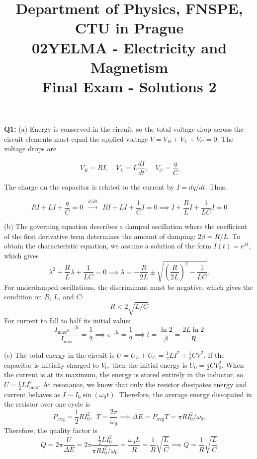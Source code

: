\documentclass[a4paper,12pt]{article}
\title{{\large Department of Physics, FNSPE, CTU in Prague} \\
                  02YELMA - Electricity and Magnetism \\ 
          {\Large \textbf{Final Exam - Solutions 2}}\vspace{-1cm}}
\date{}
\author{}
\begin{document}
\maketitle
\vspace{-0.9cm}

\noindent

\textbf{Q1:} (a) Energy is conserved in the circuit, so the total voltage drop across the circuit elements must equal the applied voltage $V=V_R+V_L+V_C=0$. The voltage drops are

\[
V_R = R I, \quad V_L = L\frac{dI}{dt}, \quad V_C = \frac{q}{C}
\]

The charge on the capacitor is related to the current by $I=dq/dt$. Thus,

\[
R I
+
L\dot{I}
+
\frac{q}{C} = 0 ~~\xrightarrow{d/dt}~~ 
R\dot{I}
+
L\ddot{I}
+
\frac{1}{C}I=0 \implies \boxed{
\ddot{I}
+
\frac{{R}}{L}\dot{I}
+
\frac{1}{LC}I
=
0
}
\]

(b) The governing equation describes a damped oscillation where the coefficient of the first derivative term determines the amount of damping: $2\beta = R/L$. To obtain the characteristic equation, we assume a solution of the form $I(t)=e^{\lambda t}$, which gives
\[
\lambda^2 + \frac{R}{L}\lambda + \frac{1}{LC} = 0 \implies \lambda = -\frac{R}{2L} \pm \sqrt{\left(\frac{R}{2L}\right)^2 - \frac{1}{LC}}.
\]
For underdamped oscillations, the discriminant must be negative, which gives the condition on $R$, $L$, and $C$:
\[
\boxed{
R<2\sqrt{L/C}
}
\]
For current to fall to half its initial value:
\[
\frac{I_\text{max}e^{-\beta t}}{I_\text{max}} = \frac{1}{2} \implies e^{-\beta t} = \frac{1}{2} \implies \boxed{t = \frac{\ln 2}{\beta} = \frac{2L\ln 2}{R}}
\]

(c) The total energy in the circuit is $U = U_L + U_C = \frac{1}{2}LI^2 + \frac{1}{2}CV^2$. If the capacitor is initially charged to $V_0$, then the initial energy is $U_0 = \frac{1}{2}CV_0^2$. When the current is at its maximum, the energy is stored entirely in the inductor, so $U = \frac{1}{2}LI_\text{max}^2$. At resonance, we know that only the resistor dissipates energy and current behaves as $I \sim I_0\sin(\omega_0 t)$. Therefore, the average energy dissopated in the resistor over one cycle is
\[
P_\text{avg} = \frac{1}{2}RI_0^2,~~T = \frac{2\pi}{\omega_0}  \implies \Delta E = P_\text{avg}T = \pi RI_0^2/\omega_0.
\]
Therefore, the quality factor is
\[
Q = 2\pi\frac{U}{\Delta E} = 2\pi\frac{\frac{1}{2}LI_0^2}{\pi RI_0^2/\omega_0} = \frac{\omega_0 L}{R} = \frac{1}{R}\sqrt{\frac{L}{C}} \implies \boxed{
Q = \frac{1}{R}\sqrt{\frac{L}{C}}
}
\]
\end{document}
